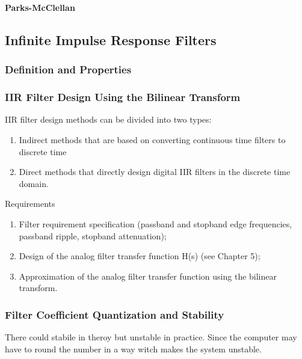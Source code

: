 \documentclass{article}
\begin{document}
\textbf{Parks-McClellan}

\subsection{Infinite Impulse Response Filters}
\subsubsection{Definition and Properties}

\subsubsection{IIR Filter Design Using the Bilinear Transform}
IIR filter design methods can be divided into two types:
\begin{enumerate}
    \item Indirect methods that are based on converting continuous time filters to discrete time
    \item Direct methods that directly design digital IIR filters in the discrete time domain.
\end{enumerate}



Requirements
\begin{enumerate}
    \item Filter requirement specification (passband and stopband edge frequencies, passband ripple, stopband attenuation);
    \item Design of the analog filter transfer function H(s) (see Chapter 5);
    \item Approximation of the analog filter transfer function using the bilinear transform.
\end{enumerate}


\subsubsection{Filter Coefficient Quantization and Stability}
There could stabile in theroy but unstable in practice. Since the computer may have to 
round the number in a way witch makes the system unstable.
\end{document}
